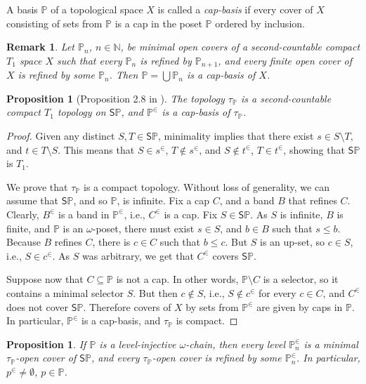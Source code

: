 \documentclass[12pt]{amsart}
\theoremstyle{plain}
\newtheorem{remark}[theorem]{\bf Remark}
\newtheorem{proposition}[theorem]{\bf Proposition}
\newcommand \Sp{{\mathsf{S}}}
\newcommand \NN{\mathbb{N}}
\newcommand \PPb{\mathbb{P}}
\begin{document}
A basis $\PPb$  of a topological space $X$ is called a \emph{cap-basis} if every cover of $X$ consisting of sets from $\PPb$ is a cap in the poset $\PPb$ ordered by inclusion.

\begin{remark}
\label{re:SeqGivesCapBasis}
Let $\PPb_n$, $n \in \NN$, be minimal open covers of a second-countable compact $T_1$ space $X$  such that every $\PPb_{n}$ is refined by $\PPb_{n+1}$, and every finite open cover of $X$ is refined by some $\PPb_n$. Then $\PPb=\bigcup \PPb_n$ is a cap-basis of $X$.
\end{remark}

\begin{proposition}[Proposition 2.8 in \cite{BaBiVi}]
		\label{pr:BBV}
		The topology $\tau_\PPb$ is a second-countable compact $T_1$ topology on $\Sp \PPb$, and $\PPb^\in$ is a cap-basis of $\tau_\PPb$.
\end{proposition}
	
	\begin{proof}
		Given any distinct $S, T \in \Sp \PPb$, minimality implies that there exist $s \in S \setminus T$, and $t \in T \setminus S$. This means that $S \in s^\in$, $T \not \in s^\in$, and $S \not \in t^\in $, $T \in t^\in$, showing that $\Sp \PPb$ is $T_1$.
		
		We prove that $\tau_\PPb$ is a compact topology. Without loss of generality, we can assume that $\Sp \PPb$, and so $\PPb$, is infinite. Fix a cap $C$, and a band $B$ that refines $C$. Clearly, $B^\in$ is a band in $\PPb^\in$, i.e., $C^\in$ is a cap. Fix $S \in \Sp \PPb$. As $S$ is infinite, $B$ is finite, and $\PPb$ is an $\omega$-poset, there must exist $s \in S$, and $b \in B$ such that $s \leq b$. Because $B$ refines $C$, there is $c \in C$ such that $b \leq c$. But $S$ is an up-set, so $c \in S$, i.e., $S \in c^\in$. As $S$ was arbitrary, we get that $C^\in$ covers $\Sp \PPb$.
		
		Suppose now that $C \subseteq \PPb$ is not a cap. In other words, $\PPb \setminus C$ is a selector, so it contains a minimal selector $S$. But then $c \not \in S$, i.e., $S \not \in c^\in$ for every $c \in C$, and $C^\in$ does not cover $\Sp \PPb$. Therefore covers of $X$ by sets from $\PPb^\in$ are given by caps in $\PPb$. In particular, $\PPb^\in$ is a cap-basis, and
		$\tau_\PPb$ is compact.
	\end{proof}

\begin{proposition}
\label{pr:LevelMin-CovMin}
	If $\PPb$ is a level-injective $\omega$-chain, then every level $\PPb_n^\in$ is a minimal $\tau_\PPb$-open cover of $\Sp \PPb$, and every $\tau_\PPb$-open cover is refined by some $\PPb_n^\in$. In particular, $p^\in \neq \emptyset$, $p \in \PPb$.
\end{proposition}
\end{document}
